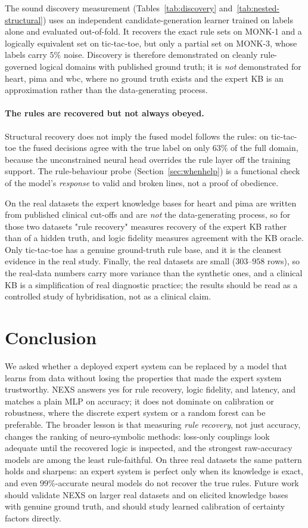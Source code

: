 \documentclass[11pt]{article}
\newcommand{\nexs}{\textsc{NEXS}}
\begin{document}
The sound discovery measurement (Tables~\ref{tab:discovery}
and~\ref{tab:nested-structural}) uses an independent candidate-generation learner
trained on labels alone and evaluated out-of-fold. It recovers the exact rule sets
on MONK-1 and a logically equivalent set on tic-tac-toe, but only a partial set on
MONK-3, whose labels carry $5\%$ noise. Discovery is therefore demonstrated on
cleanly rule-governed logical domains with published ground truth; it is \emph{not}
demonstrated for heart, pima and wbc, where no ground truth exists and the expert
KB is an approximation rather than the data-generating process.

\paragraph{The rules are recovered but not always obeyed.}
Structural recovery does not imply the fused model follows the rules: on
tic-tac-toe the fused decisions agree with the true label on only $63\%$ of the
full domain, because the unconstrained neural head overrides the rule layer off
the training support. The rule-behaviour probe (Section~\ref{sec:whenhelp}) is a
functional check of the model's \emph{response} to valid and broken lines, not a
proof of obedience.

On the real datasets the expert knowledge bases for heart and pima are written
from published clinical cut-offs and are \emph{not} the data-generating process,
so for those two datasets "rule recovery" measures recovery of the expert KB
rather than of a hidden truth, and logic fidelity measures agreement with the KB
oracle. Only tic-tac-toe has a genuine ground-truth rule base, and it is the
cleanest evidence in the real study. Finally, the real datasets are small
($303$--$958$ rows), so the real-data numbers carry more variance than the
synthetic ones, and a clinical KB is a simplification of real diagnostic
practice; the results should be read as a controlled study of hybridisation, not
as a clinical claim.

\section{Conclusion}
\label{sec:conclusion}
We asked whether a deployed expert system can be replaced by a model that learns
from data without losing the properties that made the expert system trustworthy.
\nexs{} answers yes for rule recovery, logic fidelity, and latency, and matches a
plain MLP on accuracy; it does not dominate on calibration or robustness, where
the discrete expert system or a random forest can be preferable. The broader
lesson is that measuring \emph{rule recovery}, not just accuracy, changes the
ranking of neuro-symbolic methods: loss-only couplings look adequate until the
recovered logic is inspected, and the strongest raw-accuracy models are among the
least rule-faithful. On three real datasets the same pattern holds and sharpens:
an expert system is perfect only when its knowledge is exact, and even $99\%$-accurate
neural models do not recover the true rules. Future work should validate \nexs{}
on larger real datasets and on elicited knowledge bases with genuine ground truth,
and should study learned calibration of certainty factors directly.



\end{document}
